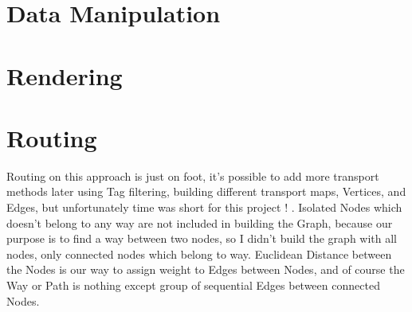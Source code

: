 \documentclass[a4paper,english]{book}
\begin{document}
\section{Data Manipulation}
\section{Rendering}
\section{Routing}
Routing on this approach is just on foot, it’s possible to add more transport methods later using Tag filtering, building different transport maps, Vertices, and Edges, but unfortunately time was short for this project ! .
Isolated Nodes which doesn’t belong to any way are not included in building the Graph, because our purpose is to find a way between two nodes, so I didn’t build the graph with all nodes, only connected nodes which belong to way.
Euclidean Distance between the Nodes is our way to assign weight to Edges between Nodes, and of course the Way or Path is nothing except group of sequential Edges between connected Nodes.
\end{document}
